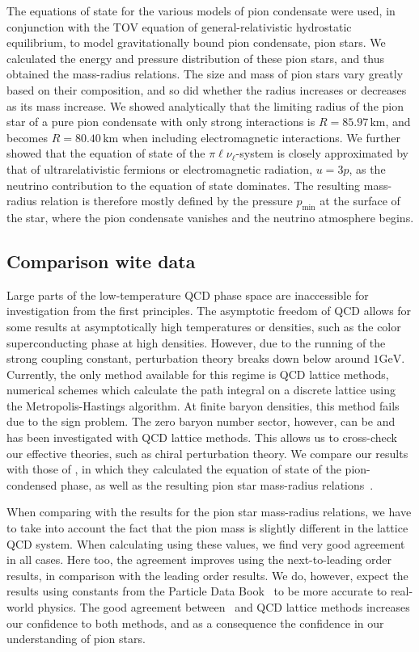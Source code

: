 The equations of state for the various models of pion condensate were used, in conjunction with the TOV equation of general-relativistic hydrostatic equilibrium, to model gravitationally bound pion condensate, pion stars.
We calculated the energy and pressure distribution of these pion stars, and thus obtained the mass-radius relations.
The size and mass of pion stars vary greatly based on their composition, and so did whether the radius increases or decreases as its mass increase.
We showed analytically that the limiting radius of the pion star of a pure pion condensate with only strong interactions is $R = 85.97\,\text{km}$, and becomes $R = 80.40\,\text{km}$ when including electromagnetic interactions.
We further showed that the equation of state of the $\pi\ell\nu_\ell$-system is closely approximated by that of ultrarelativistic fermions or electromagnetic radiation, $u = 3p$, as the neutrino contribution to the equation of state dominates.
The resulting mass-radius relation is therefore mostly defined by the pressure $p_\text{min}$ at the surface of the star, where the pion condensate vanishes and the neutrino atmosphere begins.


\subsection{Comparison wite data}

Large parts of the low-temperature QCD phase space are inaccessible for investigation from the first principles.
The asymptotic freedom of QCD allows for some results at asymptotically high temperatures or densities, such as the color superconducting phase at high densities.
However, due to the running of the strong coupling constant, perturbation theory breaks down below around $1 \text{GeV}$.
Currently, the only method available for this regime is QCD lattice methods, numerical schemes which calculate the path integral on a discrete lattice using the Metropolis-Hastings algorithm.
At finite baryon densities, this method fails due to the sign problem.
The zero baryon number sector, however, can be and has been investigated with QCD lattice methods.
This allows us to cross-check our effective theories, such as chiral perturbation theory. 
We compare our results with those of \citeauthor{brandtNewClassCompact2018}, in which they calculated the equation of state of the pion-condensed phase, as well as the resulting pion star mass-radius relations~\autocite{brandtNewClassCompact2018}.


When comparing with the results for the pion star mass-radius relations, we have to take into account the fact that the pion mass is slightly different in the lattice QCD system.
When calculating using these values, we find very good agreement in all cases.
Here too, the agreement improves using the next-to-leading order results, in comparison with the leading order results.
We do, however, expect the results using constants from the Particle Data Book~\autocite{particledatagroupReviewParticlePhysics2020} to be more accurate to real-world physics.
The good agreement between \chpt\, and QCD lattice methods increases our confidence to both methods, and as a consequence the confidence in our understanding of pion stars.


